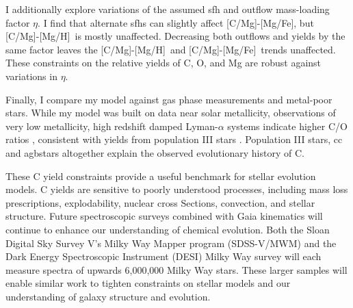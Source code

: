 \documentclass[12pt,oneside,letterpaper]{report}
\newcommand{\cc}{\gls{cc}}
\newcommand{\agb}{\gls{agb}}
\newcommand{\sfh}{\gls{sfh}}
\newcommand{\caah}{[C/Mg]-[Mg/H]}
\newcommand{\caafe}{[C/Mg]-[Mg/Fe]}
\begin{document}
I additionally explore variations of the assumed \sfh{} and outflow mass-loading factor $\eta$. I find that alternate \sfh{}s can slightly affect \caafe, but \caah~is mostly unaffected. Decreasing both outflows and yields by the same factor leaves the \caah~and \caafe~trends unaffected. These constraints on the relative yields of C, O, and Mg are robust against variations in $\eta$.

Finally, I compare my model against gas phase measurements and metal-poor stars. While my model was built on data near solar metallicity, observations of very low metallicity, high redshift damped Lyman-$\alpha$ systems indicate higher C/O ratios \citep{cooke+17}, consistent with yields from population III stars \citep[e.g.][]{hirschi07}. Population III stars, \cc\, and \agb stars altogether explain the observed evolutionary history of C.

These C yield constraints provide a useful benchmark for stellar evolution models. C yields are sensitive to poorly understood processes, including mass loss prescriptions, explodability, nuclear cross Sections, convection, and stellar structure. Future spectroscopic surveys combined with Gaia kinematics \citep{gaia} will continue to enhance our understanding of chemical evolution. Both the Sloan Digital Sky Survey V's Milky Way Mapper program ({\sc SDSS-V/MWM}) \citep{sdssv} and the Dark Energy Spectroscopic Instrument ({\sc DESI}) Milky Way survey \citep{desi, desi:mw} will each measure spectra of upwards 6,000,000 Milky Way stars. These larger samples will enable similar work to tighten constraints on stellar models and our understanding of galaxy structure and evolution.



\newpage

 



\appendix
% 
\end{document}
